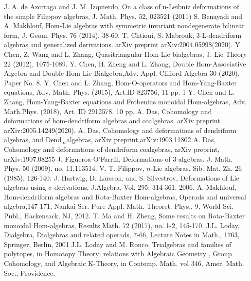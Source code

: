 \documentclass[a4paper,11pt]{article}
\theoremstyle{definition}
\begin{document}
\begin{thebibliography}{999}
 J. A. de Azcrraga and J. M. Izquierdo, On a class of n-Leibniz deformations of the
simple Filippov algebras, J. Math. Phys. 52, 023521 (2011)
 S. Benayadi and A. Makhlouf, Hom-Lie algebras with symmetric invariant nondegenerate bilinear form,
J. Geom. Phys. 76 (2014), 38-60.
 T. Chtioui, S. Mabrouk,  $3$-L-dendriform algebras and generalized derivations. arXiv preprint arXiv:2004.05998(2020).
 Y. Chen, Z. Wang and L. Zhang, Quasitriangular Hom-Lie bialgebras, J. Lie Theory 22 (2012), 1075-1089.
 Y. Chen, H. Zheng and L. Zhang, Double Hom-Associative Algebra and Double Hom-Lie Bialgebra,Adv. Appl. Clifford Algebra 30 (2020), Paper No. 8.
 Y. Chen and L. Zhang, Hom-O-operators and Hom-Yang-Baxter equations, Adv. Math. Phys. (2015), Art.ID 823756, 11 pp. 1
 Y. Chen and L. Zhang, Hom-Yang-Baxter equations and Frobenius monoidal Hom-algebras, Adv. Math.Phys. (2018), Art. ID 2912578, 10 pp.
 A. Das, Cohomology and deformations of hom-dendriform algebras and coalgebras. arXiv preprint arXiv:2005.14249(2020).
 A. Das, Cohomology and deformations of dendriform algebras, and Dend$_{\infty}$algebras, arXiv preprint,arXiv:1903.11802
 A. Das, Cohomology and deformations of dendriform coalgebras, arXiv preprint, arXiv:1907.08255
 J. Figueroa-O'Farrill, Deformations of 3-algebras. J. Math. Phys. 50 (2009), no. 11,113514.
  V. T. Filippov, $n$-Lie algebras,   Sib. Mat. Zh. 26 (1985), 126-140.
J. Hartwig, D. Larsson,  and S. Silvestrov, Deformations of Lie algebras using $\sigma$-derivations, J.Algebra, Vol. 295: 314-361, 2006.
 A. Makhlouf, Hom-dendriform algebras and Rota-Baxter Hom-algebras, Operads and universal algebra,147-171, Nankai Ser. Pure Appl. Math. Theoret. Phys., 9, World Sci. Publ., Hackensack, NJ, 2012.
 T. Ma and H. Zheng, Some results on Rota-Baxter monoidal Hom-algebras, Results Math. 72 (2017), no.
1-2, 145-170.
 J.L. Loday, Dialgebra, Dialgebras and related operads, 7-66, Lecture Notes in Math., 1763, Springer,
Berlin, 2001
 J.L. Loday and M. Ronco, Trialgebras and families of polytopes, in Homotopy
Theory: relations with Algebraic Geometry , Group Cohomology, and Algebraic K-Theory, in Contemp. Math. vol 346, Amer. Math. Soc., Providence,

\end{thebibliography}
\end{document}
